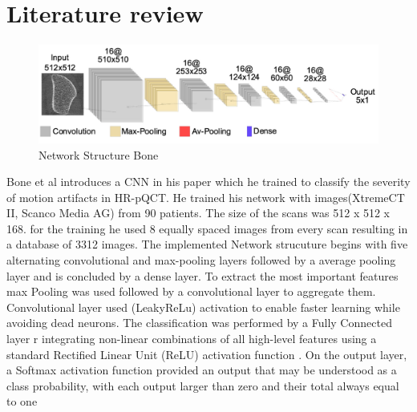 \documentclass[
a4paper, 
12pt,
grayscalebody, %
abstract=on,
twoside, BCOR10mm, 12pt, DIV13,headinclude, footexclude, final, abstracton, openright
]{ibireprt}
\numberwithin{equation}{chapter}
\numberwithin{table}{chapter}
\numberwithin{figure}{chapter}
\numberwithin{algorithm}{chapter}
\numberwithin{example}{chapter}
\numberwithin{example}{chapter}
\begin{document}
\chapter{Literature review}

\begin{figure}[h]	
	\center
	\includegraphics[width = 1 \textwidth]{Bone_Network_Structure.png}%
	\caption{Network Structure Bone}
	\label{fig:fig1}
\end{figure}%

Bone et al introduces a CNN in his paper which he trained to classify the severity of motion artifacts in HR-pQCT. He trained his network with images(XtremeCT II, Scanco Media AG) from 90 patients. The size of the scans was 512 x 512 x 168. for the training he used 8 equally spaced images from every scan  resulting in a database of 3312 images.
The implemented Network strucuture begins with five alternating convolutional and max-pooling layers followed by a average pooling layer and is concluded by a dense layer. To extract the most important features max Pooling was used followed by a convolutional layer to aggregate them. Convolutional layer used (LeakyReLu) activation to enable faster learning while avoiding dead neurons.
 The classification was performed by a Fully Connected layer r integrating non-linear combinations of all high-level features using a standard Rectified Linear
Unit (ReLU) activation function . On the output layer, a Softmax activation function provided an output that may be understood as a class probability, with each output larger than zero and their total always equal to one
\end{document}
